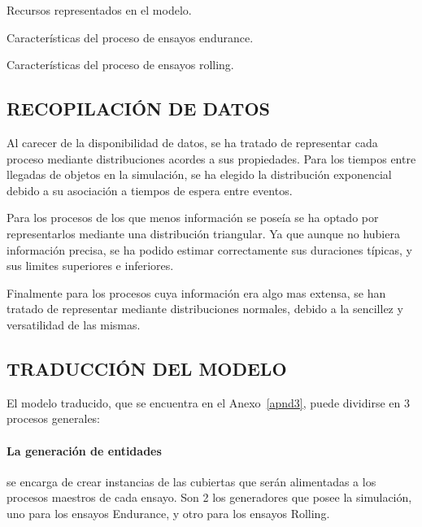 \begin{table}
	\centering
	\caption{Recursos representados en el modelo.}
	
	\label{tab:3_tbl_rsrc}
\end{table}

\begin{table}
	\centering
	\caption{Características del proceso de ensayos endurance.}
	
	\label{tab:3_tbl_indoor_det}
\end{table}

\begin{table}
	\centering
	\caption{Características del proceso de ensayos rolling.}
	
	\label{tab:3_tbl_rr_det}
\end{table}


\subsection{RECOPILACIÓN DE DATOS}

Al carecer de la disponibilidad de datos, se ha tratado de representar cada proceso mediante distribuciones acordes a sus propiedades. Para los tiempos entre llegadas de objetos en la simulación, se ha elegido la distribución exponencial debido a su asociación a tiempos de espera entre eventos.

Para los procesos de los que menos información se poseía se ha optado por representarlos mediante una distribución triangular. Ya que aunque no hubiera información precisa, se ha podido estimar correctamente sus duraciones típicas, y sus limites superiores e inferiores.

Finalmente para los procesos cuya información era algo mas extensa, se han tratado de representar mediante distribuciones normales, debido a la sencillez y versatilidad de las mismas.
\subsection{TRADUCCIÓN DEL MODELO}

El modelo traducido, que se encuentra en el Anexo~\ref{apnd3},
puede dividirse en 3 procesos generales:

\paragraph{La generación de entidades}
se encarga de crear instancias de las cubiertas que serán alimentadas a los procesos maestros de cada ensayo. Son 2 los generadores que posee la simulación, uno para los ensayos Endurance, y otro para los ensayos Rolling.

